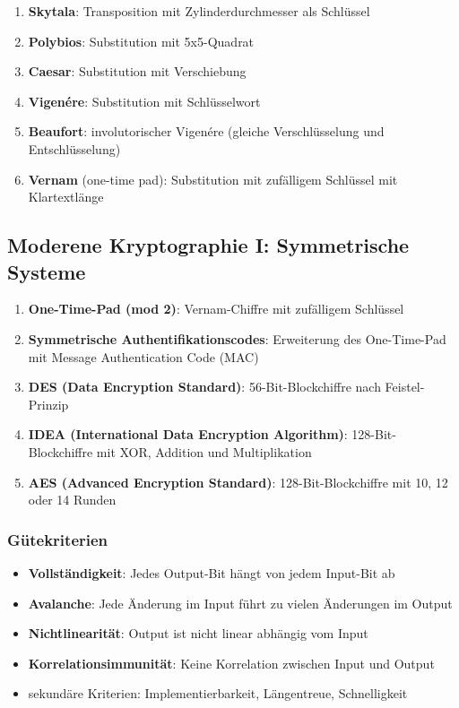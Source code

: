 \documentclass{article}
\begin{document}
\begin{enumerate}
  \item \textbf{Skytala}: Transposition mit Zylinderdurchmesser als Schlüssel
  \item \textbf{Polybios}: Substitution mit 5x5-Quadrat
  \item \textbf{Caesar}: Substitution mit Verschiebung
  \item \textbf{Vigenére}: Substitution mit Schlüsselwort
  \item \textbf{Beaufort}: involutorischer Vigenére (gleiche Verschlüsselung und Entschlüsselung)
  \item \textbf{Vernam} (one-time pad): Substitution mit zufälligem Schlüssel mit Klartextlänge
\end{enumerate}



\subsection{Moderene Kryptographie I: Symmetrische Systeme}
\begin{enumerate}
  \item \textbf{One-Time-Pad (mod 2)}: Vernam-Chiffre mit zufälligem Schlüssel
  \item \textbf{Symmetrische Authentifikationscodes}: Erweiterung des One-Time-Pad mit Message Authentication Code (MAC)
  \item \textbf{DES (Data Encryption Standard)}: 56-Bit-Blockchiffre nach Feistel-Prinzip
  \item \textbf{IDEA (International Data Encryption Algorithm)}: 128-Bit-Blockchiffre mit XOR, Addition und Multiplikation
  \item \textbf{AES (Advanced Encryption Standard)}: 128-Bit-Blockchiffre mit 10, 12 oder 14 Runden
\end{enumerate}

\subsubsection{Gütekriterien}
\begin{itemize}
  \item \textbf{Vollständigkeit}: Jedes Output-Bit hängt von jedem Input-Bit ab
  \item \textbf{Avalanche}: Jede Änderung im Input führt zu vielen Änderungen im Output
  \item \textbf{Nichtlinearität}: Output ist nicht linear abhängig vom Input
  \item \textbf{Korrelationsimmunität}: Keine Korrelation zwischen Input und Output
  \item sekundäre Kriterien: Implementierbarkeit, Längentreue, Schnelligkeit
\end{itemize}
\end{document}
